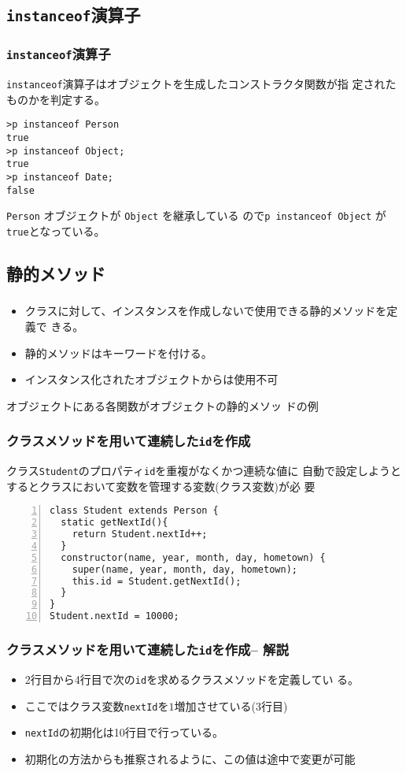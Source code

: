 \subsection{\protect\texttt{instanceof}演算子}
\begin{frame}[containsverbatim]
 \frametitle{\protect\texttt{instanceof}演算子}
\texttt{instanceof}演算子はオブジェクトを生成したコンストラクタ関数が指
定されたものかを判定する。
\begin{Verbatim}
>p instanceof Person
true
>p instanceof Object;
true
>p instanceof Date;
false
\end{Verbatim}
\Verb+Person+ オブジェクトが \verb+Object+ を継承している
 ので\texttt{p instanceof Object} が\texttt{true}となっている。
 \end{frame}
\subsection{静的メソッド}
\begin{frame}[containsverbatim]
 \frametitle{}
 \begin{itemize}
  \item クラスに対して、インスタンスを作成しないで使用できる静的メソッドを定義で
きる。
  \item 静的メソッドはキーワードを付ける。
  \item インスタンス化されたオブジェクトからは使用不可
 \end{itemize}
 オブジェクトにある各関数がオブジェクトの静的メソッ
ドの例
 \end{frame}
\begin{frame}[containsverbatim]
 \frametitle{クラスメソッドを用いて連続した\protect\texttt{id}を作成}
クラス\texttt{Student}のプロパティ\texttt{id}を重複がなくかつ連続な値に
自動で設定しようとするとクラスにおいて変数を管理する変数(クラス変数)が必
 要
\begin{Verbatim}[numbers=left]
class Student extends Person {
  static getNextId(){
    return Student.nextId++;
  }
  constructor(name, year, month, day, hometown) {
    super(name, year, month, day, hometown);
    this.id = Student.getNextId();
  }
}
Student.nextId = 10000;
\end{Verbatim}
 \end{frame}
\begin{frame}[containsverbatim]
 \frametitle{クラスメソッドを用いて連続した\protect\texttt{id}を作成--
 解説}
\begin{itemize}
 \item 2行目から4行目で次の\texttt{id}を求めるクラスメソッドを定義してい
       る。
 \item ここではクラス変数\texttt{nextId}を$1$増加させている(3行目)
 \item \texttt{nextId}の初期化は10行目で行っている。
 \item 初期化の方法からも推察されるように、この値は途中で変更が可能
\end{itemize}
 \end{frame}
